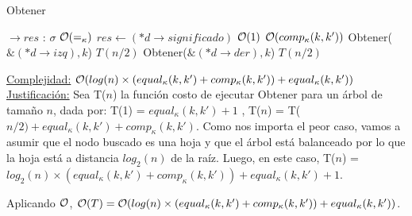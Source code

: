 \begin{Algoritmos}
\begin{algorithm}
\caption{Obtener}
\begin{algorithmic}[1]
$\to res$ : \texttt{$\sigma$}	
	\Comment $\mathcal{O}(=_{\kappa})$
		\State $res\gets (*d\to significado)$
		\Comment $\mathcal{O}(1)$
	\Else
		\Comment $\mathcal{O}(comp_{\kappa}(k, k'))$
			\State Obtener($\&(*d\to izq), k$)	
			\Comment $T(n/2)$	
		\Else
			\State Obtener($\&(*d\to der), k$)
			\Comment $T(n/2)$
		\EndIf
	\EndIf

\EndProcedure
\end{algorithmic}
\underline{Complejidad:} $\mathcal{O}(log(n) \times (equal_{\kappa}(k, k') + comp_{\kappa}(k, k')) + equal_{\kappa}(k, k'))$ \\
\underline{Justificación:} Sea T($n$) la función costo de ejecutar Obtener para un árbol de tamaño $n$, dada por: T(1) = $equal_{\kappa}(k, k') + 1$ , T($n$) = T($n/2) + equal_{\kappa}(k, k') + comp_{\kappa}(k, k')$. Como nos importa el peor caso, vamos a asumir que el nodo buscado es una hoja y que el árbol está balanceado por lo que la hoja está a distancia $log_2(n)$ de la raíz. Luego, en este caso, T($n$) = $log_2(n) \times (equal_{\kappa}(k, k') + comp_{\kappa}(k, k')) + equal_{\kappa}(k, k') + 1$. 

Aplicando $\mathcal{O}$, $\mathcal{O}(T) = \mathcal{O}(log(n) \times (equal_{\kappa}(k, k') + comp_{\kappa}(k, k')) + equal_{\kappa}(k, k'))$.
\end{algorithm}


\end{Algoritmos}
